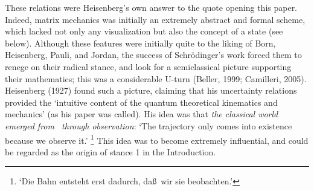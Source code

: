 \documentclass[12pt,titlepage]{article}
\begin{document}
These relations were Heisenberg's own answer to the quote opening this paper.  Indeed, matrix mechanics was initially an extremely abstract and formal scheme, which lacked not only any visualization but also the concept of a state (see below). Although these features were initially quite to the liking of Born, Heisenberg, Pauli, and Jordan, the success of Schr\"{o}dinger's work forced them to renege on their radical stance, and look for a semiclassical picture supporting their mathematics; this was a considerable U-turn  (Beller, 1999; Camilleri, 2005).  Heisenberg (1927) found such a picture, claiming that his uncertainty relations provided the `intuitive content of the quantum theoretical kinematics and mechanics' (as his paper was called). His idea was that {\it the classical world emerged from \qm\ through observation}: `The trajectory only comes into existence because we observe it.' \footnote{`Die Bahn entsteht erst dadurch, da\ss\ wir sie beobachten.'}  This idea was to become extremely influential, and could be regarded as the origin of stance 1 in the Introduction. 
\end{document}
